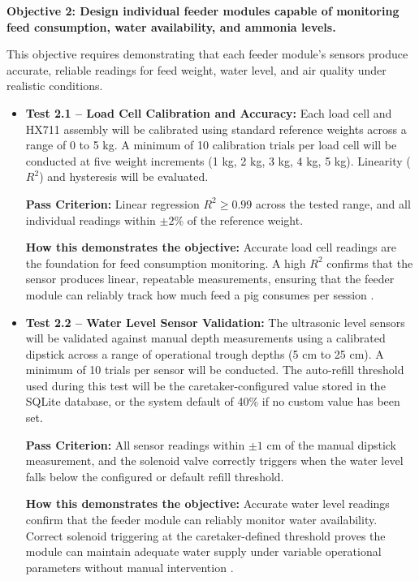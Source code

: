 \textbf{Objective 2: Design individual feeder modules capable of monitoring feed consumption, water availability, and ammonia levels.}

This objective requires demonstrating that each feeder module's sensors produce accurate, reliable readings for feed weight, water level, and air quality under realistic conditions.

\begin{itemize}
  \item \textbf{Test 2.1 -- Load Cell Calibration and Accuracy:} Each load cell and HX711 assembly will be calibrated using standard reference weights across a range of 0 to 5 kg. A minimum of 10 calibration trials per load cell will be conducted at five weight increments (1 kg, 2 kg, 3 kg, 4 kg, 5 kg). Linearity ($R^2$) and hysteresis will be evaluated.

    \textbf{Pass Criterion:} Linear regression $R^2 \geq 0.99$ across the tested range, and all individual readings within $\pm 2\%$ of the reference weight.

    \textbf{How this demonstrates the objective:} Accurate load cell readings are the foundation for feed consumption monitoring. A high $R^2$ confirms that the sensor produces linear, repeatable measurements, ensuring that the feeder module can reliably track how much feed a pig consumes per session \cite{dingcong2017monitoring,adeoye2025animalia}.

  \item \textbf{Test 2.2 -- Water Level Sensor Validation:} The ultrasonic level sensors will be validated against manual depth measurements using a calibrated dipstick across a range of operational trough depths (5 cm to 25 cm). A minimum of 10 trials per sensor will be conducted. The auto-refill threshold used during this test will be the caretaker-configured value stored in the SQLite database, or the system default of 40\% if no custom value has been set.

    \textbf{Pass Criterion:} All sensor readings within $\pm 1$ cm of the manual dipstick measurement, and the solenoid valve correctly triggers when the water level falls below the configured or default refill threshold.

    \textbf{How this demonstrates the objective:} Accurate water level readings confirm that the feeder module can reliably monitor water availability. Correct solenoid triggering at the caretaker-defined threshold proves the module can maintain adequate water supply under variable operational parameters without manual intervention \cite{adeoye2025animalia,beyondtech2025smart}.


\end{itemize}
